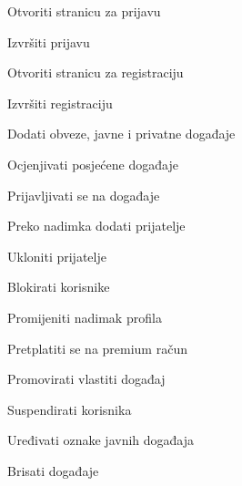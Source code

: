 			
			\begin{packed_enum}
				\item  {}
				
				\begin{packed_enum}
					
					\item 	Otvoriti stranicu za prijavu
					\item   Izvršiti prijavu
					\item 	Otvoriti stranicu za registraciju
					\item   Izvršiti registraciju
					
					
				\end{packed_enum}
			
				\item  {}
				
				\begin{packed_enum}
					
					\item Dodati obveze, javne i privatne događaje
					\item Ocjenjivati posjećene događaje
					\item Prijavljivati se na događaje
					\item Preko nadimka dodati prijatelje
					\item Ukloniti prijatelje
					\item Blokirati korisnike
					\item Promijeniti nadimak profila
					\item Pretplatiti se na premium račun
					
				\end{packed_enum}
			
				\item  {}
				
				\begin{packed_enum}
					
					\item Promovirati vlastiti događaj
			
					
				\end{packed_enum}
			
				\item  {}
				
				\begin{packed_enum}
					
					\item Suspendirati korisnika
					\item Uređivati oznake javnih događaja
					\item Brisati događaje
					

\end{packed_enum}
\end{packed_enum}
